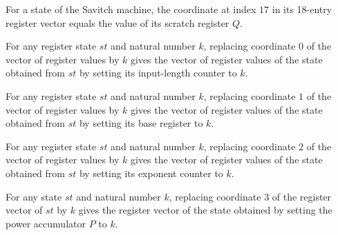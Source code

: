 \begin{lemma}
\label{Complexity.LogProg.SavitchARM.St.toV_Q}
\leanok
{}
For a state of the Savitch machine, the coordinate at index $17$ in its 18-entry
register vector equals the value of its scratch register $Q$.
\end{lemma}

\begin{lemma}
\label{Complexity.LogProg.SavitchARM.St.upd_n}
\leanok
{}
For any register state $st$ and natural number $k$, replacing coordinate $0$ of the
vector of register values by $k$ gives the vector of register values of the state
obtained from $st$ by setting its input-length counter to $k$.
\end{lemma}

\begin{lemma}
\label{Complexity.LogProg.SavitchARM.St.upd_a}
\leanok
{}
For any register state $st$ and natural number $k$, replacing coordinate $1$ of the
vector of register values by $k$ gives the vector of register values of the state
obtained from $st$ by setting its base register to $k$.
\end{lemma}

\begin{lemma}
\label{Complexity.LogProg.SavitchARM.St.upd_X}
\leanok
{}
For any register state $st$ and natural number $k$, replacing coordinate $2$ of the
vector of register values by $k$ gives the vector of register values of the state
obtained from $st$ by setting its exponent counter to $k$.
\end{lemma}

\begin{lemma}
\label{Complexity.LogProg.SavitchARM.St.upd_P}
\leanok
{}
For any state $st$ and natural number $k$, replacing coordinate $3$ of the register
vector of $st$ by $k$ gives the register vector of the state obtained by setting the
power accumulator $P$ to $k$.
\end{lemma}

